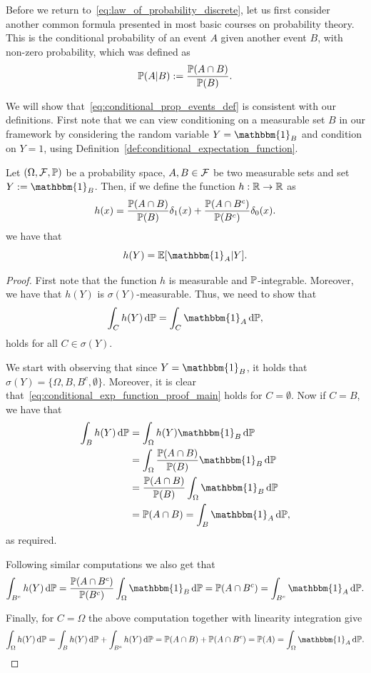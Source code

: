 Before we return to~\eqref{eq:law_of_probability_discrete}, let us first consider another common formula presented in most basic courses on probability theory. This is the conditional probability of an event $A$ given another event $B$, with non-zero probability, which was defined as
\begin{equation}\label{eq:conditional_prop_events_def}
	\mathbb P(A|B) := \frac{\mathbb P(A \cap B)}{\mathbb P(B)}.
\end{equation}

We will show that~\eqref{eq:conditional_prop_events_def} is consistent with our definitions. First note that we can view conditioning on a measurable set $B$ in our framework by considering the random variable $Y = \mathbbm{1}_B$ and condition on $Y = 1$, using Definition~\ref{def:conditional_expectation_function}.

\begin{lemma}\label{lem:conditional_expectation_function}
Let $(\Omega, \mathcal F, \mathbb P)$ be a probability space, $A, B \in \mathcal F$ be two measurable sets and set $Y := \mathbbm{1}_B$. Then, if we define the function $h : \mathbb R \to \mathbb R$ as
\[
	h(x) = \frac{\mathbb P(A \cap B)}{\mathbb P(B)} \delta_{1}(x) + \frac{\mathbb P(A \cap B^c)}{\mathbb P(B^c)}\delta_{0}(x).
\]
we have that
\[
	h(Y) = \bbE[\mathbbm{1}_A | Y].
\]
\end{lemma}

\begin{proof}
First note that the function $h$ is measurable and $\mathbb P$-integrable. Moreover, we have that $h(Y)$ is $\sigma(Y)$-measurable. Thus, we need to show that
\begin{equation}\label{eq:conditional_exp_function_proof_main}
	\int_C h(Y) \, \dd \bbP = \int_C \mathbbm{1}_A \, \dd \bbP,
\end{equation}
holds for all $C \in \sigma(Y)$.

We start with observing that since $Y = \mathbbm{1}_B$, it holds that $\sigma(Y) = \{\Omega, B, B^c, \emptyset\}$. Moreover, it is clear that~\eqref{eq:conditional_exp_function_proof_main} holds for $C = \emptyset$. Now if $C = B$, we have that
\begin{align*}
	\int_B h(Y) \, \dd \bbP &= \int_\Omega h(Y) \mathbbm{1}_B \, \dd \bbP \\
	&= \int_\Omega \frac{\bbP(A \cap B)}{\bbP(B)} \mathbbm{1}_B \, \dd \bbP \\
	&= \frac{\bbP(A \cap B)}{\bbP(B)} \int_\Omega \mathbbm{1}_B \, \dd \bbP \\
	&= \bbP(A \cap B) = \int_B \mathbbm{1}_A \, \dd \bbP,
\end{align*}
as required.

Following similar computations we also get that
\[
	\int_{B^c} h(Y) \, \dd \bbP = \frac{\bbP(A \cap B^c)}{\bbP(B^c)} \int_\Omega \mathbbm{1}_B \, \dd \bbP
	= \bbP(A \cap B^c) = \int_{B^c} \mathbbm{1}_A \, \dd \bbP.
\]

Finally, for $C = \Omega$ the above computation together with linearity integration give
\[
	\int_\Omega h(Y) \, \dd \bbP = \int_B h(Y) \, \dd \bbP + \int_{B^c} h(Y) \, \dd \bbP
	= \bbP(A \cap B) + \bbP(A \cap B^c) = \bbP(A) = \int_\Omega \mathbbm{1}_A \, \dd \bbP.
\]
\end{proof}

